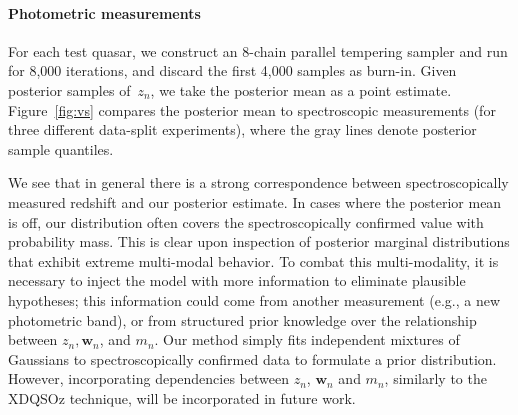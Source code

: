 \documentclass{article} %
\begin{document}
\paragraph{Photometric measurements}
For each test quasar, we construct an 8-chain parallel tempering sampler and run for 8,000 iterations, and discard the first 4,000 samples as burn-in. 
Given posterior samples of~$z_n$, we take the posterior mean as a point estimate.  
Figure~\ref{fig:vs} compares the posterior mean to spectroscopic measurements (for three different data-split experiments), where the gray lines denote posterior sample quantiles. 

We see that in general there is a strong correspondence between spectroscopically measured redshift and our posterior estimate.
In cases where the posterior mean is off, our distribution often covers the spectroscopically confirmed value with probability mass.
This is clear upon inspection of posterior marginal distributions that exhibit extreme multi-modal behavior.  
To combat this multi-modality, it is necessary to inject the model with more information to eliminate plausible hypotheses; this information could come from another measurement (e.g., a new photometric band), or from structured prior knowledge over the relationship between $z_n, \mathbf{w}_n$, and $m_n$.  Our method simply fits independent mixtures of Gaussians to spectroscopically confirmed data to formulate a prior distribution.  However, incorporating dependencies between $z_n$, $\mathbf{w}_n$ and $m_n$, similarly to the XDQSOz technique, will be incorporated in future work. 
\end{document}
